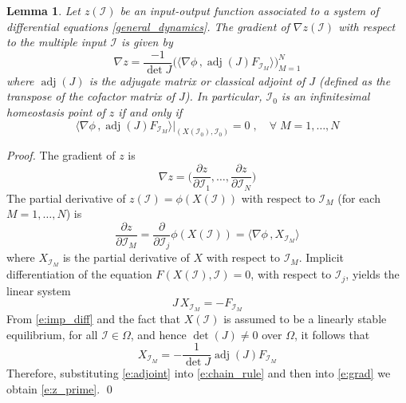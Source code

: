 \documentclass[10pt,a4paper]{amsart}
\newtheorem{lemma}{Lemma}
\newcommand{\II}{{\mathcal I}}
\DeclareMathOperator{\adj}{adj}
\begin{document}
\begin{lemma} \label{t:z_nabla}
Let $z(\mathcal{I})$ be an input-output function associated to a system of differential equations \eqref{general_dynamics}.
The gradient of $\nabla z(\II)$ with respect to the multiple input $\II$ is given by
\begin{equation} \label{e:z_prime}
\nabla z =  
\frac{-1}{\det J} 
\bigg(\langle \nabla \phi\, , \adj(J) F_{\II_M} \rangle \bigg)_{M=1}^N
\end{equation}
where $\adj(J)$ is the \emph{adjugate matrix} or \emph{classical adjoint} of $J$ (defined as the transpose of the cofactor matrix of $J$).
In particular, $\II_0$ is an infinitesimal homeostasis point of $z$ if and only if
\begin{equation} \label{e:cond_homeo}
 \langle \nabla \phi \, , \adj(J) F_{\II_M}\rangle \big|_{(X(\II_0),\II_0)} = 0 \;,\quad\forall\; M=1,\ldots,N
\end{equation}
\end{lemma}

\begin{proof}
The gradient of $z$ is
\begin{equation} \label{e:grad}
\nabla z = \bigg(\frac{\partial z}{\partial \II_1},\ldots,
\frac{\partial z}{\partial \II_N}\bigg)
\end{equation}
The partial derivative of $z(\mathcal{I})=\phi(X(\mathcal{I}))$ with respect to $\II_M$ (for each $M=1,\ldots,N$) is
\begin{equation} \label{e:chain_rule}
\frac{\partial z}{\partial \II_M} = \frac{\partial}{\partial \II_j} \phi(X(\II)) = \langle \nabla \phi\, ,  X_{\II_M} \rangle
\end{equation}
where $X_{\II_M}$ is the partial derivative of $X$ with respect to $\II_M$.
Implicit differentiation of the equation $F(X(\mathcal{I}),\mathcal{I})=0$, with respect to $\II_j$, yields the linear system
\begin{equation} \label{e:imp_diff}
J \, X_{\II_M} = - F_{\II_M}
\end{equation}
From \eqref{e:imp_diff} and the fact that $X(\II)$ is assumed to be a linearly stable equilibrium, for all $\II\in \Omega$, and hence $\det(J)\neq 0$ over $\Omega$, it follows that
\begin{equation} \label{e:adjoint}
X_{\II_M} = - \frac{1}{\det J} \adj(J) F_{\II_M}
\end{equation}
Therefore, substituting \eqref{e:adjoint} into \eqref{e:chain_rule} and then into \eqref{e:grad} we obtain \eqref{e:z_prime}.
\qed
\end{proof}
\end{document}
